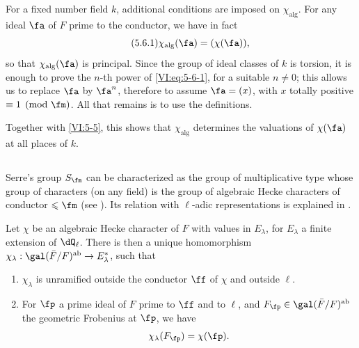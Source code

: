 For a fixed number field $k$, additional conditions are 
imposed on $\chi_\text{alg}$. For any ideal $\fa$ of $F$ prime to the 
conductor, we have in fact 
\begin{equation*}\tag{5.6.1}\label{VI:eq:5-6-1}
  \chi_\text{alg}(\fa) = (\chi(\fa)) \text{,} 
\end{equation*}
so that $\chi_\text{alg}(\fa)$ is principal. Since the group of 
  ideal classes of $k$ is torsion, it is enough to prove the $n$-th power 
of \eqref{VI:eq:5-6-1}, for a suitable $n\ne 0$; this allows us 
to replace $\fa$ by $\fa^n$, therefore to assume $\fa=(x)$, with $x$ totally 
positive $\equiv 1\pmod\fm$. All that remains is to use the definitions. 

Together with \ref{VI:5-5}, this shows that $\chi_\text{alg}$ determines the 
valuations of $\chi(\fa)$ at all places of $k$. 





\subsection{}\label{VI:5-7}

Serre's group $S_\fm$ can be characterized as the 
group of multiplicative type whose group of characters (on any 
field) is the group of algebraic Hecke characters of conductor 
$\leqslant \fm$ (see \cite[II 2.1 et 2.2]{se68}). Its relation with 
$\ell$-adic representations is explained in \cite[II 2.3]{se68}.





\begin{theorem_}[{\cite{se68}}]\label{VI:5-8}
Let $\chi$ be an algebraic Hecke character of $F$ with values in $E_\lambda$, for 
$E_\lambda$ a finite extension of $\dQ_\ell$. There is then a unique 
  homomorphism $\chi_\lambda:\gal(\bar F/F)^\textnormal{ab} \to E_\lambda^\ast$, such 
that 
\begin{enumerate}[\indent (i)]
  \item $\chi_\lambda$ is unramified outside the conductor $\ff$ of 
    $\chi$ and outside $\ell$. 
  \item For $\fp$ a prime ideal of $F$ prime to $\ff$ and to $\ell$, 
    and $F_\fp\in \gal(\bar F/F)^\textnormal{ab}$ the geometric Frobenius 
    at $\fp$, we have 
    \[
      \chi_\lambda(F_\fp) = \chi(\fp) \text{.}
    \] 
\end{enumerate}
\end{theorem_}





